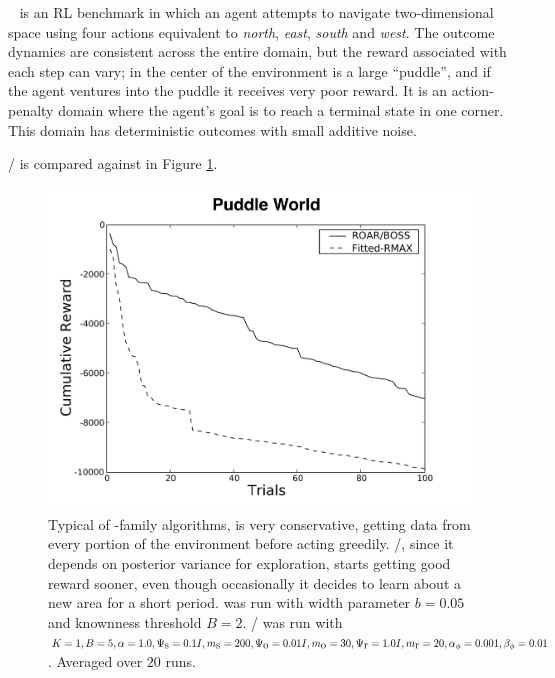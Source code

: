 ~\cite{boyan94b} is an RL benchmark in which an agent attempts to navigate two-dimensional space using four actions equivalent to \emph{north}, \emph{east}, \emph{south} and \emph{west}. The outcome dynamics are consistent across the entire domain, but the reward associated with each step can vary; in the center of the environment is a large ``puddle'', and if the agent ventures into the puddle it receives very poor reward. It is an action-penalty domain where the agent's goal is to reach a terminal state in one corner. This domain has deterministic outcomes with small additive noise.

/ is compared against  in Figure \ref{fig:puddle}.

\begin{figure}[t]
\vskip 0.2in
\begin{center}
\centerline{\includegraphics[width=\columnwidth]{figures/puddleFigure}}
\caption{Typical of -family algorithms,  is very conservative, getting data from every portion of the environment before acting greedily. /, since it depends on posterior variance for exploration, starts getting good reward sooner, even though occasionally it decides to learn about a new area for a short period.  was run with width parameter $b=0.05$ and knownness threshold $B=2$. / was run with $K=1, B=5, \alpha=1.0,\Psi_{\mbox s}=0.1I, m_{\mbox s}=200, \Psi_{\mbox o}=0.01I, m_{\mbox o}=30, \Psi_{\mbox r}=1.0I,m_{\mbox r}=20,\alpha_\phi=0.001,\beta_\phi=0.01$. Averaged over $20$ runs.}
\label{fig:puddle}
\end{center}
\vskip -0.2in
\end{figure} 


